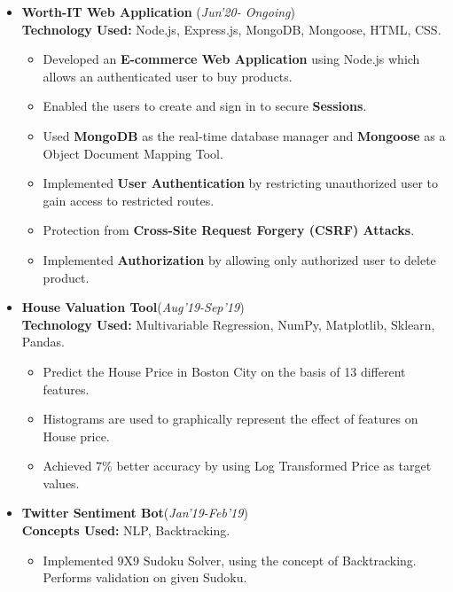 \documentclass[10pt]{extarticle}
\begin{document}
\begin{itemize}
\item \textbf{Worth-IT Web Application} \hfill\hfill(\textit{Jun'20- Ongoing})
\\\textbf{Technology Used: }Node.js, Express.js, MongoDB, Mongoose, HTML, CSS.
\begin{itemize}
\item Developed an \textbf{E-commerce Web Application} using Node.js which allows an authenticated user to buy products. 
\item Enabled the users to create and sign in to secure \textbf{Sessions}. 
\item Used \textbf{MongoDB} as the real-time database manager and \textbf{Mongoose} as a Object Document Mapping Tool.
\item Implemented \textbf{User Authentication} by restricting unauthorized user to gain access to restricted routes.
\item Protection from \textbf{Cross-Site Request Forgery (CSRF) Attacks}.
\item Implemented \textbf{Authorization} by allowing only authorized user to delete product.
\end{itemize}
\vspace{1mm}
\item \textbf{House Valuation Tool}\hfill\hfill(\textit{Aug'19-Sep'19})
\\\textbf{Technology Used: }Multivariable Regression, NumPy, Matplotlib, Sklearn, Pandas.
\begin{itemize}
\item Predict the House Price in Boston City on the basis of 13 different features.
\item Histograms are used to graphically represent the effect of features on House price.
\item Achieved 7\% better accuracy by using Log Transformed Price as target values.
\end{itemize}
\vspace{1mm}
\item \textbf{Twitter Sentiment Bot}\hfill\hfill(\textit{Jan'19-Feb'19})
\\\textbf{Concepts Used: }NLP, Backtracking.
\begin{itemize}
\item Implemented 9X9 Sudoku Solver, using the concept of Backtracking. Performs validation on given Sudoku.
\end{itemize}
\end{itemize}
\end{document}
